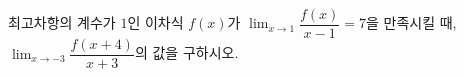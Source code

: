 최고차항의 계수가 $1$인 이차식 $f(x)$가 $\displaystyle\lim_{x\to1}\dfrac{f(x)}{x-1}=7$을 만족시킬 때, $\displaystyle\lim_{x\to-3}\dfrac{f(x+4)}{x+3}$의 값을 구하시오.
